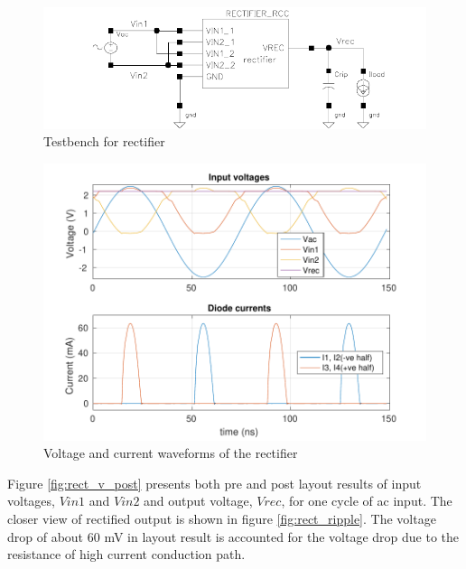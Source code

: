 \documentclass[12pt,a4paper,UKenglish]{article}
\begin{document}
\begin{figure}[htbp] %
   \centering
   \includegraphics[width=\textwidth]{img/rectifier_testbench.pdf} 
   \caption{Testbench for rectifier}
   \label{rect_tb}
\end{figure}

\begin{figure}[H] %
   \centering
   \includegraphics[width=\textwidth]{img/rectifier_VI.pdf} 
   \caption{Voltage and current waveforms of the rectifier}
   \label{rect_plot}
\end{figure}

Figure  \ref{fig:rect_v_post}  presents both pre and post layout results of input voltages, $Vin1$ and $Vin2$  and output voltage, $Vrec$, for one cycle of ac input. The closer view of rectified output is shown in figure \ref{fig:rect_ripple}. The voltage drop of about 60 mV in layout result is accounted for the voltage drop due to 
the resistance of high current conduction path. \\
\end{document}
